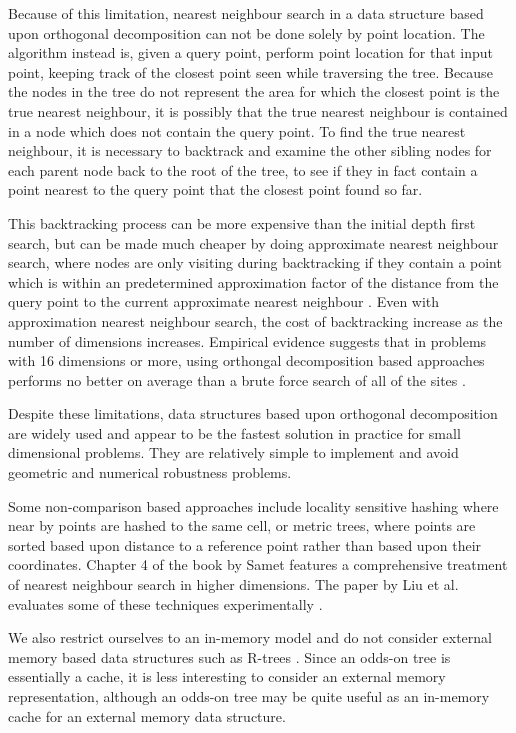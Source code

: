 \documentclass[mcs]{scsthesis}
\begin{document}
Because of this limitation, nearest neighbour search in a data structure based
upon orthogonal decomposition can not be done solely by point location. The
algorithm instead is, given a query point, perform point location for that
input point, keeping track of the closest point seen while traversing the tree.
Because the nodes in the tree do not represent the area for which the closest
point is the true nearest neighbour, it is possibly that the true nearest
neighbour is contained in a node which does not contain the query point. To
find the true nearest neighbour, it is necessary to backtrack and examine the
other sibling nodes for each parent node back to the root of the tree, to see
if they in fact contain a point nearest to the query point that the closest
point found so far.

This backtracking process can be more expensive than the initial depth first
search, but can be made much cheaper by doing approximate nearest neighbour
search, where nodes are only visiting during backtracking if they contain a
point which is within an predetermined approximation factor of the distance from
the query point to the current approximate nearest neighbour \cite{app-ann}.
Even with approximation nearest neighbour search, the cost of backtracking
increase as the number of dimensions increases. Empirical evidence suggests that
in problems with 16 dimensions or more, using orthongal decomposition based
approaches performs no better on average than a brute force search of all of the
sites \cite{fastvector}.

Despite these limitations, data structures based upon orthogonal decomposition
are widely used and appear to be the fastest solution in practice for small
dimensional problems. They are relatively simple to implement and avoid
geometric and numerical robustness problems. 

Some non-comparison based approaches include locality sensitive hashing
\cite{lsh} where near by points are hashed to the same cell, or metric trees,
where points are sorted based upon distance to a reference point rather than
based upon their coordinates. Chapter 4 of the book by Samet \cite{samet}
features a comprehensive treatment of nearest neighbour search in higher
dimensions. The paper by Liu et al. evaluates some of these techniques
experimentally \cite{practicalann}. 

We also restrict ourselves to an in-memory model and do not consider external
memory based data structures such as R-trees \cite{rtree}. Since an odds-on tree
is essentially a cache, it is less interesting to consider an external memory
representation, although an odds-on tree may be quite useful as an in-memory
cache for an external memory data structure.
\end{document}
